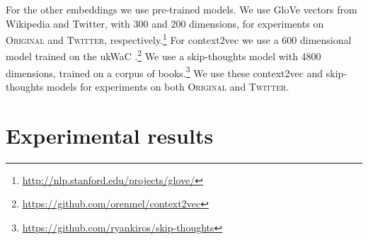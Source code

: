 \documentclass[11pt]{article}
\newcommand\original{\textsc{Original}\xspace}
\newcommand\twitter{\textsc{Twitter}\xspace}
\newcommand\glove{GloVe\xspace}
\begin{document}
For the other embeddings we use pre-trained models. We use \glove
vectors from Wikipedia and Twitter, with 300 and 200 dimensions, for
experiments on \original and \twitter,
respectively.\footnote{\url{http://nlp.stanford.edu/projects/glove/}}
For context2vec we use a 600 dimensional model trained on the ukWaC
\citep{Ferraresi2008}.\footnote{\url{https://github.com/orenmel/context2vec}}
We use a skip-thoughts model with 4800 dimensions, trained on a corpus
of books.\footnote{\url{https://github.com/ryankiros/skip-thoughts}}
We use these context2vec and skip-thoughts models for experiments on
both \original and \twitter.





\section{Experimental results\label{sec:results}}




\end{document}
